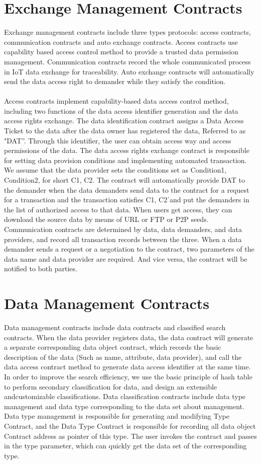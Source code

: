 \section{Exchange Management Contracts}
Exchange management contracts include three types
protocols: access contracts, communication contracts and
auto exchange contracts. Access contracts use capability
based access control method to provide a trusted data
permission management. Communication contracts record
the whole communicated process in IoT data exchange for
traceability. Auto exchange contracts will automatically send
the data access right to demander while they satisfy the
condition.
\paragraph{}Access contracts implement capability-based data access control method, including two functions of the data access
identifier generation and the data access rights exchange.
The data identification contract assigns a Data Access Ticket
to the data after the data owner has registered the data,
Referred to as "DAT”. Through this identifier, the user can
obtain access way and access permissions of the data. The
data access rights exchange contract is responsible for setting
data provision conditions and implementing automated
transaction. We assume that the data provider sets the
conditions set as Condition1, Condition2, for short C1, C2.
The contract will automatically provide DAT to the
demander when the data demanders send data to the contract
for a request for a transaction and the transaction satisfies C1, C2ˈand put the demanders in the list of authorized access to
that data. When users get access, they can download the
source data by means of URL or FTP or P2P seeds.
Communication contracts are determined by data, data
demanders, and data providers, and record all transaction
records between the three. When a data demander sends a
request or a negotiation to the contract, two parameters of the
data name and data provider are required. And vice versa, the
contract will be notified to both parties.
\section{Data Management Contracts}
Data management contracts include data contracts and
classified search contracts. When the data provider registers
data, the data contract will generate a separate corresponding
data object contract, which records the basic description of
the data (Such as name, attribute, data provider), and call the
data access contract method to generate data access identifier
at the same time. In order to improve the search efficiency,
we use the basic principle of hash table to perform secondary
classification for data, and design an extensible andcustomizable classifications. Data classification contracts
include data type management and data type corresponding
to the data set about management. Data type management is
responsible for generating and modifying Type Contract, and
the Data Type Contract is responsible for recording all data
object Contract address as pointer of this type. The user
invokes the contract and passes in the type parameter, which
can quickly get the data set of the corresponding type.
